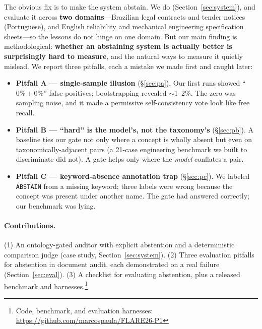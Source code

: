 \documentclass[11pt]{article}
\begin{document}
The obvious fix is to make the system abstain. We do (Section~\ref{sec:system}),
and evaluate it across \textbf{two domains}---Brazilian legal contracts and tender
notices (Portuguese), and English reliability and mechanical engineering
specification sheets---so the lessons do not hinge on one domain.
But our main finding is methodological: \textbf{whether an abstaining system is
actually better is surprisingly hard to measure}, and the natural ways to measure
it quietly mislead. We report three pitfalls, each a mistake we made first and
caught later:
\begin{itemize}
  \item \textbf{Pitfall A --- single-sample illusion} (\S\ref{sec:pa}). Our first
  runs showed ``$0\% \pm 0\%$'' false positives; bootstrapping revealed
  $\sim$1--2\%. The zero was sampling noise, and it made a permissive
  self-consistency vote look like free recall.
  \item \textbf{Pitfall B --- ``hard'' is the model's, not the taxonomy's}
  (\S\ref{sec:pb}). A baseline ties our gate not only where a concept is wholly
  absent but even on taxonomically-adjacent pairs (a 21-case engineering
  benchmark we built to discriminate did not). A gate helps only where the
  \emph{model} conflates a pair.
  \item \textbf{Pitfall C --- keyword-absence annotation trap}
  (\S\ref{sec:pc}). We labeled \texttt{ABSTAIN} from a missing keyword; three
  labels were wrong because the concept was present under another name. The gate
  had answered correctly; our benchmark was lying.
\end{itemize}

\paragraph{Contributions.} (1) An ontology-gated auditor with explicit abstention
and a deterministic comparison judge (case study, Section~\ref{sec:system}). (2)
Three evaluation pitfalls for abstention in document audit, each demonstrated on
a real failure (Section~\ref{sec:eval}). (3) A checklist for evaluating
abstention, plus a released benchmark and harnesses.\footnote{Code, benchmark,
and evaluation harnesses: \url{https://github.com/marcospaula/FLARE26-P1}}
\end{document}
